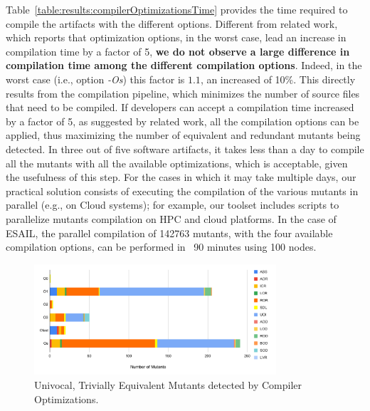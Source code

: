 Table~\ref{table:results:compilerOptimizationsTime} provides the time required to compile the artifacts with the different options. Different from related work, which reports that optimization options, in the worst case, lead an increase in compilation time by a factor of 5, \textbf{we do not observe a large difference in compilation time among the different compilation options}. Indeed, in the worst case (i.e., option \emph{-Os}) this factor is $1.1$, an increased of 10\%. This directly results from the \APPR compilation pipeline, which minimizes the number of source files that need to be compiled. If developers can accept a compilation time increased by a factor of 5, as suggested by related work, all the compilation options can be applied, thus maximizing the number of equivalent and redundant mutants being detected. In three out of five software artifacts, it takes less than a day to compile all the mutants with all the available optimizations, which is acceptable, given the usefulness of this step. For the cases in which it may take multiple days, our practical solution consists of executing the compilation of the various mutants in parallel (e.g., on Cloud systems); for example, our toolset includes scripts to parallelize mutants compilation on HPC and cloud platforms. In the case of ESAIL, the parallel compilation of 142763 mutants, with the four available compilation options, can be performed in ~90 minutes using 100 nodes.

 
 


%

\begin{figure}[tb]
\begin{center}
\includegraphics[width=9cm]{images/univ-eq}
\caption{Univocal, Trivially Equivalent Mutants detected by Compiler Optimizations.}
\label{fig:results:univeq}
\end{center}
\end{figure}

